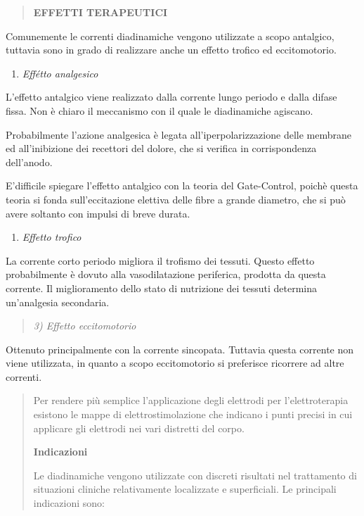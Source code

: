\documentclass[]{article}
\begin{document}
\begin{quote}
\textbf{EFFETTI TERAPEUTICI}
\end{quote}

Comunemente le correnti diadinamiche vengono utilizzate a scopo
antalgico, tuttavia sono in grado di realizzare anche un effetto trofico
ed eccitomotorio.

\begin{enumerate}
\def\labelenumi{\arabic{enumi})}
\item
  \emph{Effétto analgesico}
\end{enumerate}

L'effetto antalgico viene realizzato dalla corrente lungo periodo e
dalla difase fissa. Non è chiaro il meccanismo con il quale le
diadinamiche agiscano.

Probabilmente l'azione analgesica è legata all'iperpolarizzazione delle
membrane ed all'inibizione dei recettori del dolore, che si verifica in
corrispondenza dell'anodo.

E'difficile spiegare l'effetto antalgico con la teoria del Gate-Control,
poichè questa teoria si fonda sull'eccitazione elettiva delle fibre a
grande diametro, che si può avere soltanto con impulsi di breve durata.

\begin{enumerate}
\def\labelenumi{\arabic{enumi})}
\item
  \emph{Effetto trofico}
\end{enumerate}

La corrente corto periodo migliora il trofismo dei tessuti. Questo
effetto probabilmente è dovuto alla vasodilatazione periferica, prodotta
da questa corrente. Il miglioramento dello stato di nutrizione dei
tessuti determina un'analgesia secondaria.

\begin{quote}
\emph{3) Effetto eccitomotorio}
\end{quote}

Ottenuto principalmente con la corrente sincopata. Tuttavia questa
corrente non viene utilizzata, in quanto a scopo eccitomotorio si
preferisce ricorrere ad altre correnti.

\begin{quote}
Per rendere più semplice l'applicazione degli elettrodi per
l'elettroterapia esistono le mappe di elettrostimolazione che indicano i
punti precisi in cui applicare gli elettrodi nei vari distretti del
corpo.

\textbf{Indicazioni}

Le diadinamiche vengono utilizzate con discreti risultati nel
trattamento di situazioni cliniche relativamente localizzate e
superficiali. Le principali indicazioni sono:
\end{quote}
\end{document}
